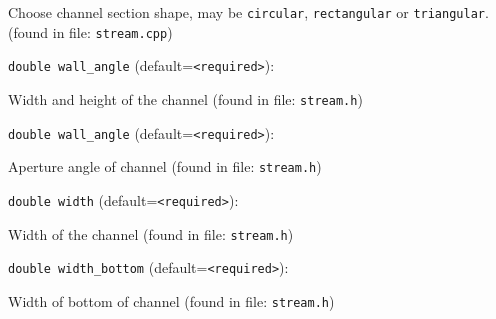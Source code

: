 Choose channel section shape, may be {\tt circular},
 {\tt rectangular} or {\tt triangular}.
 (found in file: \verb+stream.cpp+)
\item\verb+double wall_angle+ {\rm(default=\verb|<required>|)}:

Width and height of the channel
 (found in file: \verb+stream.h+)
\item\verb+double wall_angle+ {\rm(default=\verb|<required>|)}:

Aperture angle of channel
 (found in file: \verb+stream.h+)
\item\verb+double width+ {\rm(default=\verb|<required>|)}:

Width of the channel
 (found in file: \verb+stream.h+)
\item\verb+double width_bottom+ {\rm(default=\verb|<required>|)}:

Width of bottom of channel
 (found in file: \verb+stream.h+)

